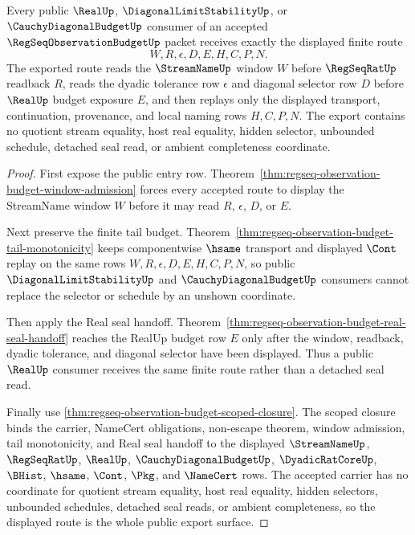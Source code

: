 \begin{theorem}
\label{thm:regseq-observation-budget-public-consumer-export}
Every public $\RealUp$, $\DiagonalLimitStabilityUp$, or $\CauchyDiagonalBudgetUp$ consumer of an accepted $\RegSeqObservationBudgetUp$ packet receives exactly the displayed finite route
$$
W,R,\epsilon,D,E,H,C,P,N.
$$
The exported route reads the $\StreamNameUp$ window $W$ before $\RegSeqRatUp$ readback $R$, reads the dyadic tolerance row $\epsilon$ and diagonal selector row $D$ before $\RealUp$ budget exposure $E$, and then replays only the displayed transport, continuation, provenance, and local naming rows $H,C,P,N$. The export contains no quotient stream equality, host real equality, hidden selector, unbounded schedule, detached seal read, or ambient completeness coordinate.
\end{theorem}
\begin{proof}
First expose the public entry row. Theorem~\ref{thm:regseq-observation-budget-window-admission} forces every accepted route to display the StreamName window $W$ before it may read $R$, $\epsilon$, $D$, or $E$.

Next preserve the finite tail budget. Theorem~\ref{thm:regseq-observation-budget-tail-monotonicity} keeps componentwise $\hsame$ transport and displayed $\Cont$ replay on the same rows $W,R,\epsilon,D,E,H,C,P,N$, so public $\DiagonalLimitStabilityUp$ and $\CauchyDiagonalBudgetUp$ consumers cannot replace the selector or schedule by an unshown coordinate.

Then apply the Real seal handoff. Theorem~\ref{thm:regseq-observation-budget-real-seal-handoff} reaches the RealUp budget row $E$ only after the window, readback, dyadic tolerance, and diagonal selector have been displayed. Thus a public $\RealUp$ consumer receives the same finite route rather than a detached seal read.

Finally use \autoref{thm:regseq-observation-budget-scoped-closure}. The scoped closure binds the carrier, NameCert obligations, non-escape theorem, window admission, tail monotonicity, and Real seal handoff to the displayed $\StreamNameUp$, $\RegSeqRatUp$, $\RealUp$, $\CauchyDiagonalBudgetUp$, $\DyadicRatCoreUp$, $\BHist$, $\hsame$, $\Cont$, $\Pkg$, and $\NameCert$ rows. The accepted carrier has no coordinate for quotient stream equality, host real equality, hidden selectors, unbounded schedules, detached seal reads, or ambient completeness, so the displayed route is the whole public export surface.
\end{proof}

